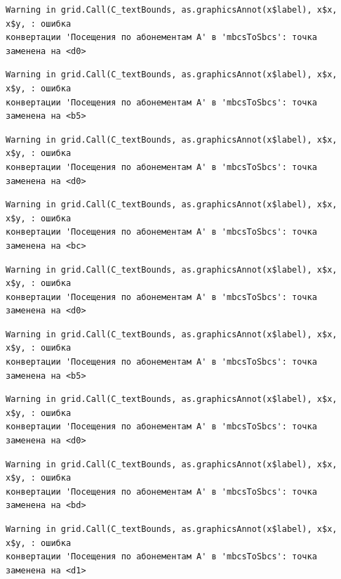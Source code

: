 \documentclass[
  letterpaper,
  DIV=11,
  numbers=noendperiod]{scrreprt}
\begin{document}
\begin{verbatim}
Warning in grid.Call(C_textBounds, as.graphicsAnnot(x$label), x$x, x$y, : ошибка
конвертации 'Посещения по абонементам А' в 'mbcsToSbcs': точка заменена на <d0>
\end{verbatim}

\begin{verbatim}
Warning in grid.Call(C_textBounds, as.graphicsAnnot(x$label), x$x, x$y, : ошибка
конвертации 'Посещения по абонементам А' в 'mbcsToSbcs': точка заменена на <b5>
\end{verbatim}

\begin{verbatim}
Warning in grid.Call(C_textBounds, as.graphicsAnnot(x$label), x$x, x$y, : ошибка
конвертации 'Посещения по абонементам А' в 'mbcsToSbcs': точка заменена на <d0>
\end{verbatim}

\begin{verbatim}
Warning in grid.Call(C_textBounds, as.graphicsAnnot(x$label), x$x, x$y, : ошибка
конвертации 'Посещения по абонементам А' в 'mbcsToSbcs': точка заменена на <bc>
\end{verbatim}

\begin{verbatim}
Warning in grid.Call(C_textBounds, as.graphicsAnnot(x$label), x$x, x$y, : ошибка
конвертации 'Посещения по абонементам А' в 'mbcsToSbcs': точка заменена на <d0>
\end{verbatim}

\begin{verbatim}
Warning in grid.Call(C_textBounds, as.graphicsAnnot(x$label), x$x, x$y, : ошибка
конвертации 'Посещения по абонементам А' в 'mbcsToSbcs': точка заменена на <b5>
\end{verbatim}

\begin{verbatim}
Warning in grid.Call(C_textBounds, as.graphicsAnnot(x$label), x$x, x$y, : ошибка
конвертации 'Посещения по абонементам А' в 'mbcsToSbcs': точка заменена на <d0>
\end{verbatim}

\begin{verbatim}
Warning in grid.Call(C_textBounds, as.graphicsAnnot(x$label), x$x, x$y, : ошибка
конвертации 'Посещения по абонементам А' в 'mbcsToSbcs': точка заменена на <bd>
\end{verbatim}

\begin{verbatim}
Warning in grid.Call(C_textBounds, as.graphicsAnnot(x$label), x$x, x$y, : ошибка
конвертации 'Посещения по абонементам А' в 'mbcsToSbcs': точка заменена на <d1>
\end{verbatim}
\end{document}
